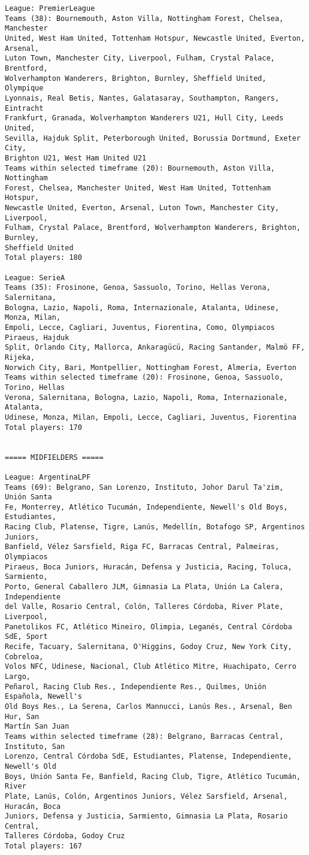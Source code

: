 \documentclass[11pt]{article}
\begin{document}
\begin{Verbatim}[commandchars=\\\{\}]
League: PremierLeague
Teams (38): Bournemouth, Aston Villa, Nottingham Forest, Chelsea, Manchester
United, West Ham United, Tottenham Hotspur, Newcastle United, Everton, Arsenal,
Luton Town, Manchester City, Liverpool, Fulham, Crystal Palace, Brentford,
Wolverhampton Wanderers, Brighton, Burnley, Sheffield United, Olympique
Lyonnais, Real Betis, Nantes, Galatasaray, Southampton, Rangers, Eintracht
Frankfurt, Granada, Wolverhampton Wanderers U21, Hull City, Leeds United,
Sevilla, Hajduk Split, Peterborough United, Borussia Dortmund, Exeter City,
Brighton U21, West Ham United U21
Teams within selected timeframe (20): Bournemouth, Aston Villa, Nottingham
Forest, Chelsea, Manchester United, West Ham United, Tottenham Hotspur,
Newcastle United, Everton, Arsenal, Luton Town, Manchester City, Liverpool,
Fulham, Crystal Palace, Brentford, Wolverhampton Wanderers, Brighton, Burnley,
Sheffield United
Total players: 180

League: SerieA
Teams (35): Frosinone, Genoa, Sassuolo, Torino, Hellas Verona, Salernitana,
Bologna, Lazio, Napoli, Roma, Internazionale, Atalanta, Udinese, Monza, Milan,
Empoli, Lecce, Cagliari, Juventus, Fiorentina, Como, Olympiacos Piraeus, Hajduk
Split, Orlando City, Mallorca, Ankaragücü, Racing Santander, Malmö FF, Rijeka,
Norwich City, Bari, Montpellier, Nottingham Forest, Almería, Everton
Teams within selected timeframe (20): Frosinone, Genoa, Sassuolo, Torino, Hellas
Verona, Salernitana, Bologna, Lazio, Napoli, Roma, Internazionale, Atalanta,
Udinese, Monza, Milan, Empoli, Lecce, Cagliari, Juventus, Fiorentina
Total players: 170


===== MIDFIELDERS =====

League: ArgentinaLPF
Teams (69): Belgrano, San Lorenzo, Instituto, Johor Darul Ta'zim, Unión Santa
Fe, Monterrey, Atlético Tucumán, Independiente, Newell's Old Boys, Estudiantes,
Racing Club, Platense, Tigre, Lanús, Medellín, Botafogo SP, Argentinos Juniors,
Banfield, Vélez Sarsfield, Riga FC, Barracas Central, Palmeiras, Olympiacos
Piraeus, Boca Juniors, Huracán, Defensa y Justicia, Racing, Toluca, Sarmiento,
Porto, General Caballero JLM, Gimnasia La Plata, Unión La Calera, Independiente
del Valle, Rosario Central, Colón, Talleres Córdoba, River Plate, Liverpool,
Panetolikos FC, Atlético Mineiro, Olimpia, Leganés, Central Córdoba SdE, Sport
Recife, Tacuary, Salernitana, O'Higgins, Godoy Cruz, New York City, Cobreloa,
Volos NFC, Udinese, Nacional, Club Atlético Mitre, Huachipato, Cerro Largo,
Peñarol, Racing Club Res., Independiente Res., Quilmes, Unión Española, Newell's
Old Boys Res., La Serena, Carlos Mannucci, Lanús Res., Arsenal, Ben Hur, San
Martín San Juan
Teams within selected timeframe (28): Belgrano, Barracas Central, Instituto, San
Lorenzo, Central Córdoba SdE, Estudiantes, Platense, Independiente, Newell's Old
Boys, Unión Santa Fe, Banfield, Racing Club, Tigre, Atlético Tucumán, River
Plate, Lanús, Colón, Argentinos Juniors, Vélez Sarsfield, Arsenal, Huracán, Boca
Juniors, Defensa y Justicia, Sarmiento, Gimnasia La Plata, Rosario Central,
Talleres Córdoba, Godoy Cruz
Total players: 167


\end{Verbatim}
\end{document}
